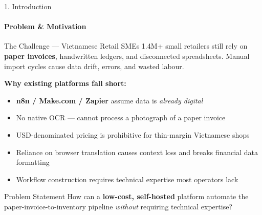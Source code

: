 \documentclass[10pt,aspectratio=169]{beamer}
\begin{document}
\begin{frame}{1. Introduction}
    \framesubtitle{Problem \& Motivation}

    \begin{block}{The Challenge --- Vietnamese Retail SMEs}
        1.4M+ small retailers still rely on \textbf{paper invoices}, handwritten ledgers, and disconnected spreadsheets. Manual import cycles cause data drift, errors, and wasted labour.
    \end{block}
    \vspace{0.3cm}

    \textbf{Why existing platforms fall short:}
    \begin{itemize}
        \item \textbf{n8n / Make.com / Zapier} assume data is \emph{already digital}
        \item No native OCR --- cannot process a photograph of a paper invoice
        \item USD-denominated pricing is prohibitive for thin-margin Vietnamese shops
        \item Reliance on browser translation causes context loss and breaks financial data formatting
        \item Workflow construction requires technical expertise most operators lack
    \end{itemize}

    \vfill
    \begin{block}{Problem Statement}
        How can a \textbf{low-cost, self-hosted} platform automate the paper-invoice-to-inventory pipeline \emph{without} requiring technical expertise?
    \end{block}
\end{frame}
\end{document}
